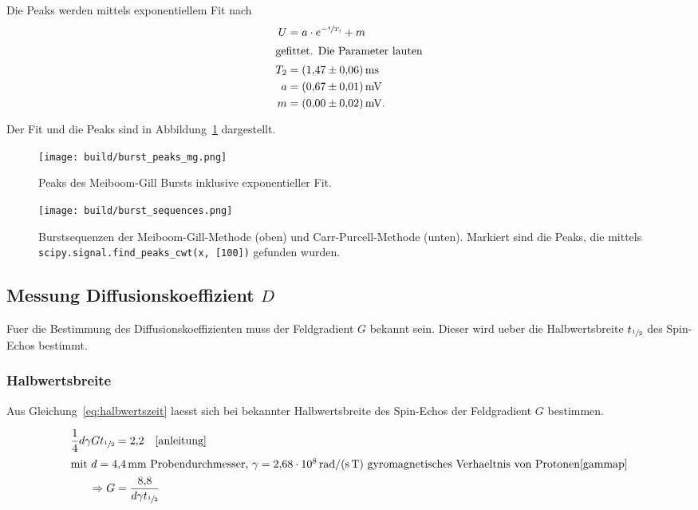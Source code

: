 Die Peaks werden mittels exponentiellem Fit nach
\begin{align}
  \nonumber U &= a \cdot e^{-\sfrac{t}{T_2}} + m \\
  \intertext{gefittet. Die Parameter lauten}
  \label{eq:t2} T_2 &= \SI{1.47 \pm 0.06}{\milli\second} \\
  \nonumber a &= \SI{0.67 \pm 0.01}{\milli\volt} \\
  \nonumber m &= \SI{0.00 \pm 0.02}{\milli\volt}.
\end{align}

Der Fit und die Peaks sind in Abbildung~\ref{fig:peaks} dargestellt.
\begin{figure}[ht]
  \centering
  \texttt{[image: build/burst\_peaks\_mg.png]}
  \caption{Peaks des Meiboom-Gill Bursts inklusive exponentieller Fit.}%
  \label{fig:peaks}
\end{figure}

\begin{figure}[ht]
  \centering
  \texttt{[image: build/burst\_sequences.png]}
  \caption{%
    Burstsequenzen der Meiboom-Gill-Methode (oben) und Carr-Purcell-Methode (unten).
    Markiert sind die Peaks, die mittels \texttt{scipy.signal.find\_peaks\_cwt(x, [100])}\cite{scipy} gefunden wurden.
  }%
  \label{fig:burst_sequences}
\end{figure}

\subsection{Messung Diffusionskoeffizient \texorpdfstring{$D$}{D}}%
\label{sub:messung_diffusionskoeffizient_d_}

Fuer die Bestimmung des Diffusionskoeffizienten muss der Feldgradient $G$ bekannt sein.
Dieser wird ueber die Halbwertsbreite $t_{\sfrac{1}{2}}$ des Spin-Echos bestimmt.

\subsubsection{Halbwertsbreite}%
\label{sub:halbwertsbreite}

Aus Gleichung~\eqref{eq:halbwertszeit} laesst sich bei bekannter Halbwertsbreite des Spin-Echos der Feldgradient $G$ bestimmen.

\begin{align}
  \nonumber
  \frac{1}{4} d \gamma G t_{\sfrac{1}{2}} &= \num{2.2} \hspace{1em} \text{\cite{anleitung}} \\
  \intertext{mit $d = \SI{4.4}{\milli\meter}$ Probendurchmesser, $\gamma = \SI{2.68e8}{\radian\per\second\per\tesla}$ gyromagnetisches Verhaeltnis von Protonen\cite{gammap}}
  \label{eq:halbwertszeit}
  \Rightarrow G &= \frac{\num{8.8}}{d \gamma t_{\sfrac{1}{2}}}
\end{align}

